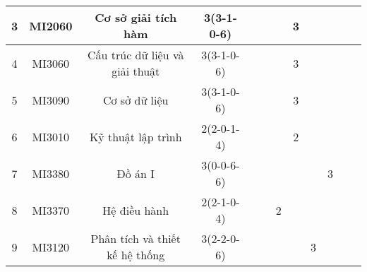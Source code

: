 \documentclass[12pt,a4paper]{report}
\begin{document}
\begin{landscape}
\begin{longtable}[c]{|c|c|c|c|c|c|c|c|c|c|c|c|}
        3                             & MI2060                          & Cơ sở giải tích hàm                                          & 3(3-1-0-6)                                                                           &             &             &             & 3           &             &             &             &             \\ \hline
        4                             & MI3060                          & Cấu trúc dữ liệu và giải thuật                               & 3(3-1-0-6)                                                                           &             &             &             & 3           &             &             &             &             \\ \hline
        5                             & MI3090                          & Cơ sở dữ liệu                                                & 3(3-1-0-6)                                                                           &             &             &             & 3           &             &             &             &             \\ \hline
        6                             & MI3010                          & Kỹ thuật lập trình                                           & 2(2-0-1-4)                                                                           &             &             &             & 2           &             &             &             &             \\ \hline
        7                             & MI3380                          & Đồ án I                                                      & 3(0-0-6-6)                                                                           &             &             &             &             &             & 3           &             &             \\ \hline
        8                             & MI3370                          & Hệ điều hành                                                 & 2(2-1-0-4)                                                                           &             &             & 2           &             &             &             &             &             \\ \hline
        9                             & MI3120                          & Phân tích và thiết kế hệ thống                               & 3(2-2-0-6)                                                                           &             &             &             &             & 3           &             &             &             \\ \hline

\end{longtable}
\end{landscape}
\end{document}
